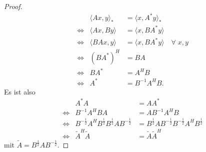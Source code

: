 \begin{proof}
 \begin{align*}
  && \langle Ax, y\rangle_*  & = \langle x, A^*y\rangle_* \\
  & \Longleftrightarrow &  \langle Ax, By\rangle & =  \langle x, BA^*y\rangle \\
  & \Longleftrightarrow &  \langle BAx, y\rangle & =  \langle x, BA^*y\rangle \quad \forall \; x,y \\
  & \Longleftrightarrow  & (BA^*)^H   & =  BA   \\
  & \Longleftrightarrow  & BA^* & =  A^HB  \\
  & \Longleftrightarrow & A^* & = B^{-1}A^HB.
 \end{align*}
Es ist also
 \begin{align*}
  && A^*A & =AA^* \\
  & \Longleftrightarrow & B^{-1}A^HBA  & = AB^{-1} A^HB  \\
  & \Longleftrightarrow  & B^{-\frac{1}{2}}A^H B^{\frac{1}{2}}B^{\frac{1}{2}}AB^{-\frac{1}{2}}  & = B^{\frac{1}{2}}AB^{-\frac{1}{2}}B^{-\frac{1}{2}}A^HB^{\frac{1}{2}}   \\
  & \Longleftrightarrow  & \tilde{A}^H \tilde{A}  & = \tilde{A} \tilde{A}^H
 \end{align*}
mit $\tilde{A}=B^{\frac{1}{2}}AB^{-\frac{1}{2}}$.
\end{proof}
%

\medskip

